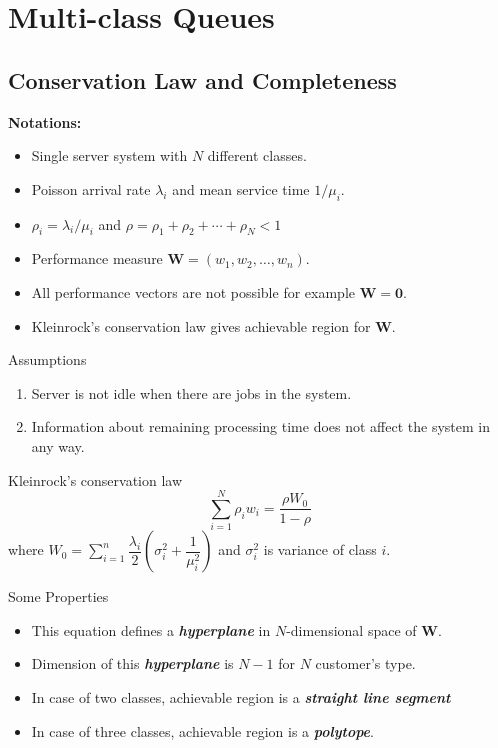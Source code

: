 \documentclass[compress, serif, onlymath, professionalfonts]{beamer}
\begin{document}
\section{Multi-class Queues}
\subsection{Conservation Law and Completeness}
\begin{frame}%
\textbf{Notations:}
\begin{itemize}
\item Single server system with $N$ different classes.
\item Poisson arrival rate $\lambda_i$ and mean service time $1/\mu_i$.
\item $\rho_i = \lambda_i/\mu_i$ and $\rho = \rho_1 + \rho_2 + \cdots +\rho_N < 1$
\item Performance measure $\mathbf{W} = (w_1,w_2, \ldots, w_n )$.
\item All performance vectors are not possible for example $\mathbf{W=0}$.
\item Kleinrock's conservation law gives achievable region for $\mathbf{W}$.
\end{itemize}
\begin{block}{Assumptions }
\begin{enumerate}
\item Server is not idle when there are jobs in the system. 
\item Information about remaining processing time does not affect the system in any way.
\end{enumerate}
\end{block}
\end{frame}

\begin{frame}{Kleinrock's conservation law \citep{Kleinrock1965}}
\begin{equation}
\sum_{i=1}^N\rho_i w_i = \dfrac{\rho W_0}{1-\rho}
\end{equation} 
where $W_0 = \sum_{i=1}^n\dfrac{\lambda_i}{2}\left(\sigma_i^2 + \dfrac{1}{\mu_i^2}\right)$ and $\sigma_i^2$ is variance of class $i$.
\begin{block}{Some Properties}
\begin{itemize}
\item This equation defines a \textit{\textbf{hyperplane}} in $N$-dimensional space of $\mathbf{W}$.
\item Dimension of this \textit{\textbf{hyperplane}} is $N-1$ for $N$ customer's type.
\item In case of two classes, achievable region is a \textit{\textbf{straight line segment}}
\item In case of three classes, achievable region is a \textit{\textbf{polytope}}.   
\end{itemize}
\end{block}
\end{frame}
\end{document}
